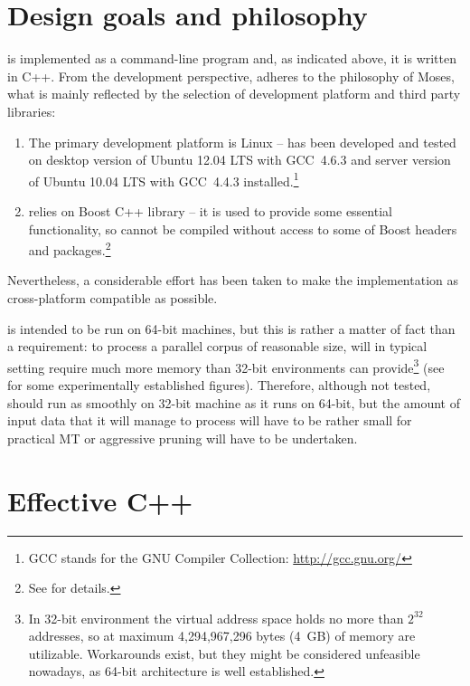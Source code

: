 \section{Design goals and philosophy}

\Eppex{} is implemented as a command-line program and, as indicated above, it is written in C++.
From the development perspective, \eppex{} adheres to the philosophy of Moses, what is mainly
reflected by the selection of development platform and third party libraries:
\begin{enumerate}
  \item The primary development platform is Linux --
  \eppex{} has been developed and tested on desktop version of Ubuntu 12.04 LTS with GCC~4.6.3 and
  server version of Ubuntu 10.04 LTS with GCC~4.4.3 installed.\footnote{GCC stands for the GNU Compiler Collection: \url{http://gcc.gnu.org/}}
  \item \Eppex{} relies on Boost C++ library -- it is used to provide
  some essential functionality, so \eppex{} cannot be compiled without access to some of Boost
  headers and packages.\footnote{See  for details.}
\end{enumerate}
Nevertheless, a considerable effort has been taken to make the implementation as cross-platform
compatible as possible.

\Eppex{} is intended to be run on 64-bit machines, but this is rather a matter of fact than
a requirement: to process a parallel corpus of reasonable size, \eppex{} will in typical
setting require much more memory than 32-bit environments can provide\footnote{In 32-bit
environment the virtual address space holds no more than $2^{32}$ addresses, so at maximum
4,294,967,296 bytes (4~GB) of memory are utilizable. Workarounds exist, but they might be
considered unfeasible nowadays, as 64-bit architecture is well established.} (see
 for some experimentally established figures).
Therefore, although not tested, \eppex{} should run as smoothly on 32-bit machine as it runs
on 64-bit, but the amount of input data that it will manage to process will have to be rather
small for practical MT or aggressive pruning will have to be undertaken.

\section{Effective C++}

